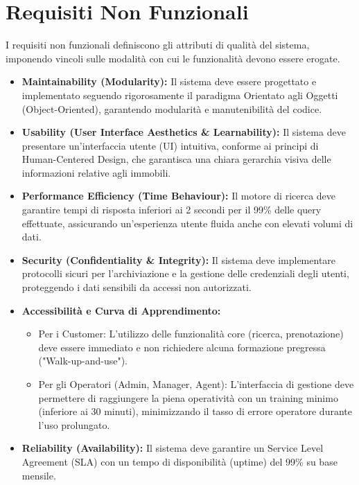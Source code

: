 \section{Requisiti Non Funzionali}

I requisiti non funzionali definiscono gli attributi di qualità del sistema, imponendo vincoli sulle 
modalità con cui le funzionalità devono essere erogate.

\begin{itemize}
    \item \textbf{Maintainability (Modularity):} Il sistema deve essere progettato e implementato seguendo 
    rigorosamente il paradigma Orientato agli Oggetti (Object-Oriented), garantendo modularità e 
    manutenibilità del codice.

    \item \textbf{Usability (User Interface Aesthetics \& Learnability):} Il sistema deve presentare un'interfaccia utente (UI) 
    intuitiva, conforme ai principi di Human-Centered Design, che garantisca una chiara gerarchia 
    visiva delle informazioni relative agli immobili.

    \item \textbf{Performance Efficiency (Time Behaviour):} Il motore di ricerca deve garantire tempi di risposta 
    inferiori ai 2 secondi per il 99\% delle query effettuate, assicurando un'esperienza utente fluida 
    anche con elevati volumi di dati.

    \item \textbf{Security (Confidentiality \& Integrity):} Il sistema deve implementare protocolli sicuri per l'archiviazione e la 
    gestione delle credenziali degli utenti, proteggendo i dati sensibili da accessi non autorizzati.

    \item \textbf{Accessibilità e Curva di Apprendimento:}
    \begin{itemize}
        \item Per i Customer: L'utilizzo delle funzionalità core (ricerca, prenotazione) deve essere 
        immediato e non richiedere alcuna formazione pregressa ("Walk-up-and-use").
        \item Per gli Operatori (Admin, Manager, Agent): L'interfaccia di gestione deve permettere di 
        raggiungere la piena operatività con un training minimo (inferiore ai 30 minuti), minimizzando 
        il tasso di errore operatore durante l'uso prolungato.
    \end{itemize}

    \item \textbf{Reliability (Availability):} Il sistema deve garantire un Service Level Agreement (SLA) con un 
    tempo di disponibilità (uptime) del 99\% su base mensile.
\end{itemize}

